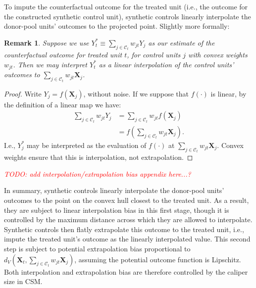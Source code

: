 \documentclass{article}
\newtheorem{remark}{Remark}
\newcommand{\Xt}{\mathbf{X}_t}
\newcommand{\Xj}{\mathbf{X}_j}
\newcommand{\Ct}{\mathcal{C}_{t}}
\newcommand{\note}[1]{\textcolor{red}{\textit{#1}}}
\begin{document}
To impute the counterfactual outcome for the treated unit (i.e., the outcome for the constructed synthetic control unit), synthetic controls linearly interpolate the donor-pool units' outcomes to the projected point.
Slightly more formally:
\begin{remark}
\label{rem:lin_interp}
    Suppose we use $Y_t^* \equiv \sum_{j \in \Ct} w_{jt} Y_j$ as our estimate of the counterfactual outcome for treated unit $t$, for control units $j$ with convex weights $w_{jt}$.
    Then we may interpret $Y_t^*$ as a linear interpolation of the control units' outcomes to $\sum_{j \in \Ct} w_{jt} \Xj$.
\end{remark}
\begin{proof}
    Write $Y_j = f(\Xj)$, without noise.
    If we suppose that $f(\cdot)$ is linear, by the definition of a linear map we have:
    \begin{align*}
        \sum_{j \in \Ct} w_{jt} Y_j
        &= \sum_{j \in \Ct} w_{jt} f(\Xj) \\
        &= f(\sum_{j \in \Ct} w_{jt} \Xj).
    \end{align*}
    I.e., $Y_j^*$ may be interpreted as the evaluation of $f(\cdot)$ at $\sum_{j \in \Ct} w_{jt} \Xj$.
    Convex weights ensure that this is interpolation, not extrapolation.
\end{proof}

\note{TODO: add interpolation/extrapolation bias appendix here...?}

In summary, synthetic controls linearly interpolate the donor-pool units' outcomes to the point on the convex hull closest to the treated unit.
As a result, they are subject to linear interpolation bias \citep{kellogg2021combining} in this first stage, though it is controlled by the maximum distance across which they are allowed to interpolate.
Synthetic controls then flatly extrapolate this outcome to the treated unit, i.e., impute the treated unit's outcome as the linearly interpolated value.
This second step is subject to potential extrapolation bias \citep{kellogg2021combining} proportional to $d_V(\Xt, \sum_{j \in \Ct} w_{jt} \Xj)$, assuming the potential outcome function is Lipschitz.
Both interpolation and extrapolation bias are therefore controlled by the caliper size in CSM.
\end{document}
